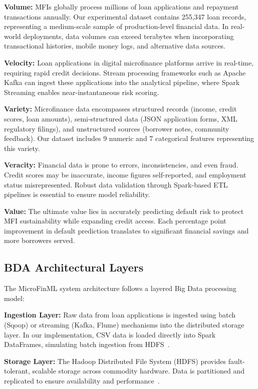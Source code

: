 \documentclass[preprint,12pt,authoryear]{elsarticle}
\begin{document}
\textbf{Volume:} MFIs globally process millions of loan applications and repayment transactions annually. Our experimental dataset contains 255,347 loan records, representing a medium-scale sample of production-level financial data. In real-world deployments, data volumes can exceed terabytes when incorporating transactional histories, mobile money logs, and alternative data sources.

\textbf{Velocity:} Loan applications in digital microfinance platforms arrive in real-time, requiring rapid credit decisions. Stream processing frameworks such as Apache Kafka can ingest these applications into the analytical pipeline, where Spark Streaming enables near-instantaneous risk scoring.

\textbf{Variety:} Microfinance data encompasses structured records (income, credit scores, loan amounts), semi-structured data (JSON application forms, XML regulatory filings), and unstructured sources (borrower notes, community feedback). Our dataset includes 9 numeric and 7 categorical features representing this variety.

\textbf{Veracity:} Financial data is prone to errors, inconsistencies, and even fraud. Credit scores may be inaccurate, income figures self-reported, and employment status misrepresented. Robust data validation through Spark-based ETL pipelines is essential to ensure model reliability.

\textbf{Value:} The ultimate value lies in accurately predicting default risk to protect MFI sustainability while expanding credit access. Each percentage point improvement in default prediction translates to significant financial savings and more borrowers served.

\subsection{BDA Architectural Layers}

The MicroFinML system architecture follows a layered Big Data processing model:

\textbf{Ingestion Layer:} Raw data from loan applications is ingested using batch (Sqoop) or streaming (Kafka, Flume) mechanisms into the distributed storage layer. In our implementation, CSV data is loaded directly into Spark DataFrames, simulating batch ingestion from HDFS~\cite{shvachko2010hdfs}.

\textbf{Storage Layer:} The Hadoop Distributed File System (HDFS) provides fault-tolerant, scalable storage across commodity hardware. Data is partitioned and replicated to ensure availability and performance~\cite{ghemawat2003gfs}.
\end{document}
